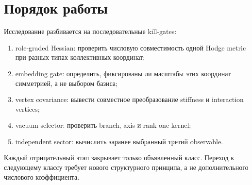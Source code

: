 \section{Порядок работы}

Исследование разбивается на последовательные kill-gates:
\begin{enumerate}
 \item role-graded Hessian: проверить числовую совместимость одной Hodge
 metric при разных типах коллективных координат;
 \item embedding gate: определить, фиксированы ли масштабы этих координат
 симметрией, а не выбором базиса;
 \item vertex covariance: вывести совместное преобразование stiffness и
 interaction vertices;
 \item vacuum selector: проверить branch, axis и rank-one kernel;
 \item independent sector: вычислить заранее выбранный третий observable.
\end{enumerate}

Каждый отрицательный этап закрывает только объявленный класс. Переход к
следующему классу требует нового структурного принципа, а не дополнительного
числового коэффициента.